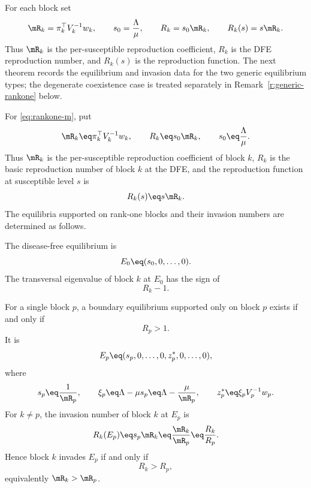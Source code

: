 For each block set
\[
\mR_k
=
\pi_k^\top V_k^{-1}w_k,
\qquad
s_0
=
\frac{\Lambda}{\mu},
\qquad
R_k
=
s_0\mR_k,
\qquad
R_k(s)
=
s\mR_k.
\]
Thus $\mR_k$ is the per-susceptible reproduction coefficient, $R_k$ is
the DFE reproduction number, and $R_k(s)$ is the reproduction
function.  The next theorem records the equilibrium and invasion data
for the two generic equilibrium types; the degenerate coexistence
case is treated separately in Remark~\ref{r:generic-rankone} below.


For \eqref{eq:rankone-m}, put
\[
\mR_k
\eq
\pi_k^\top V_k^{-1}w_k,
\qquad
R_k
\eq
s_0\mR_k,
\qquad
s_0
\eq
\frac{\Lambda}{\mu}.
\]
Thus $\mR_k$ is the per-susceptible reproduction coefficient of block $k$,
$R_k$ is the basic reproduction number of block $k$ at the DFE, and the
reproduction function at susceptible level $s$ is
\[
R_k(s)
\eq
s\mR_k.
\]
The equilibria supported on rank-one blocks and their invasion numbers are
determined as follows.

\BEN

\im
The disease-free equilibrium is
\[
E_0
\eq
(s_0,0,\ldots,0).
\]
The transversal eigenvalue of block $k$ at $E_0$ has the sign of
\[
R_k-1.
\]

\im
For a single block $p$, a boundary equilibrium supported only on block $p$
exists if and only if
\[
R_p>1.
\]
It is
\[
E_p
\eq
(s_p,0,\ldots,0,z_p^*,0,\ldots,0),
\]
where
\[
s_p
\eq
\frac1{\mR_p},
\qquad
\xi_p
\eq
\Lambda-\mu s_p
\eq
\Lambda-\frac{\mu}{\mR_p},
\qquad
z_p^*
\eq
\xi_pV_p^{-1}w_p.
\]
For $k\ne p$, the invasion number of block $k$ at $E_p$ is
\[
R_k(E_p)
\eq
s_p\mR_k
\eq
\frac{\mR_k}{\mR_p}
\eq
\frac{R_k}{R_p}.
\]
Hence block $k$ invades $E_p$ if and only if
\[
R_k>R_p,
\]
equivalently $\mR_k>\mR_p$.

\EEN
\eeT

